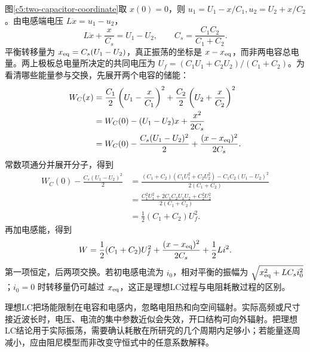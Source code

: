 图\ref{c5:two-capacitor-coordinate}取 $x(0)=0$，则 $u_1=U_1-x/C_1,u_2=U_2+x/C_2$。由电感端电压 $L\ddot x=u_1-u_2$，
\[
 L\ddot x+\frac{x}{C_s}=U_1-U_2,\qquad
 C_s=\frac{C_1C_2}{C_1+C_2}.
\]
平衡转移量为 $x_{\rm eq}=C_s(U_1-U_2)$，真正振荡的坐标是 $x-x_{\rm eq}$，而非两电容总电量。两上极板总电量所决定的共同电压为 $U_f=(C_1U_1+C_2U_2)/(C_1+C_2)$。为看清哪些能量参与交换，先展开两个电容的储能：
\[
 \begin{aligned}
 W_C(x)&=\frac{C_1}{2}\left(U_1-\frac{x}{C_1}\right)^2
 +\frac{C_2}{2}\left(U_2+\frac{x}{C_2}\right)^2\\
 &=W_C(0)-(U_1-U_2)x+\frac{x^2}{2C_s}\\
 &=W_C(0)-\frac{C_s(U_1-U_2)^2}{2}
 +\frac{(x-x_{\rm eq})^2}{2C_s}.
 \end{aligned}
\]
常数项通分并展开分子，得到
\[
 \begin{aligned}
 W_C(0)-\frac{C_s(U_1-U_2)^2}{2}
 &=\frac{(C_1+C_2)(C_1U_1^2+C_2U_2^2)-C_1C_2(U_1-U_2)^2}{2(C_1+C_2)}\\
 &=\frac{C_1^2U_1^2+2C_1C_2U_1U_2+C_2^2U_2^2}{2(C_1+C_2)}\\
 &=\frac12(C_1+C_2)U_f^2.
 \end{aligned}
\]
再加电感能，得到
\[
 W=\frac12(C_1+C_2)U_f^2+
 \frac{(x-x_{\rm eq})^2}{2C_s}+\frac12Li^2.
\]
第一项恒定，后两项交换。若初电感电流为 $i_0$，相对平衡的振幅为 $\sqrt{x_{\rm eq}^2+LC_si_0^2}$；$i_0=0$ 时转移量仍可越过 $x_{\rm eq}$，这正是理想LC过程与电阻耗散过程的区别。

理想LC把场能限制在电容和电感内，忽略电阻热和向空间辐射。实际高频或尺寸接近波长时，电压、电流的集中参数近似会失效，开口结构可向外辐射。把理想LC结论用于实际振荡，需要确认耗散在所研究的几个周期内足够小；若能量逐周减小，应由阻尼模型而非改变守恒式中的任意系数解释。
